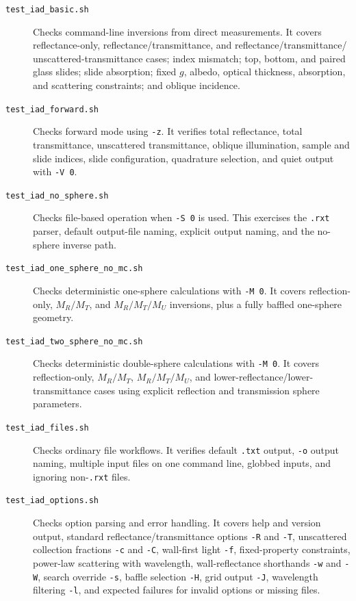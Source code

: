 \documentclass{article}
\begin{document}
\begin{description}
\item[\texttt{test\_iad\_basic.sh}]
Checks command-line inversions from direct measurements.  It covers
reflectance-only, reflectance/transmittance, and reflectance/transmittance/
unscattered-transmittance cases; index mismatch; top, bottom, and paired glass
slides; slide absorption; fixed $g$, albedo, optical thickness, absorption, and
scattering constraints; and oblique incidence.

\item[\texttt{test\_iad\_forward.sh}]
Checks forward mode using \texttt{-z}.  It verifies total reflectance, total
transmittance, unscattered transmittance, oblique illumination, sample and slide
indices, slide configuration, quadrature selection, and quiet output with
\texttt{-V 0}.

\item[\texttt{test\_iad\_no\_sphere.sh}]
Checks file-based operation when \texttt{-S 0} is used.  This exercises the
\texttt{.rxt} parser, default output-file naming, explicit output naming, and
the no-sphere inverse path.

\item[\texttt{test\_iad\_one\_sphere\_no\_mc.sh}]
Checks deterministic one-sphere calculations with \texttt{-M 0}.  It covers
reflection-only, $M_R/M_T$, and $M_R/M_T/M_U$ inversions, plus a fully baffled
one-sphere geometry.

\item[\texttt{test\_iad\_two\_sphere\_no\_mc.sh}]
Checks deterministic double-sphere calculations with \texttt{-M 0}.  It covers
reflection-only, $M_R/M_T$, $M_R/M_T/M_U$, and lower-reflectance/lower-
transmittance cases using explicit reflection and transmission sphere
parameters.

\item[\texttt{test\_iad\_files.sh}]
Checks ordinary file workflows.  It verifies default \texttt{.txt} output,
\texttt{-o} output naming, multiple input files on one command line, globbed
inputs, and ignoring non-\texttt{.rxt} files.

\item[\texttt{test\_iad\_options.sh}]
Checks option parsing and error handling.  It covers help and version output,
standard reflectance/transmittance options \texttt{-R} and \texttt{-T},
unscattered collection fractions \texttt{-c} and \texttt{-C}, wall-first light
\texttt{-f}, fixed-property constraints, power-law scattering with wavelength,
wall-reflectance shorthands \texttt{-w} and \texttt{-W}, search override
\texttt{-s}, baffle selection \texttt{-H}, grid output \texttt{-J}, wavelength
filtering \texttt{-l}, and expected failures for invalid options or missing
files.


\end{description}
\end{document}
